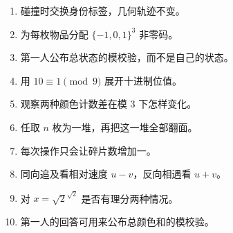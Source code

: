 \begin{enumerate}[leftmargin=*]
  \item 碰撞时交换身份标签，几何轨迹不变。
  \item 为每枚物品分配 $\{-1,0,1\}^3$ 非零码。
  \item 第一人公布总状态的模校验，而不是自己的状态。
  \item 用 $10\equiv1\pmod9$ 展开十进制位值。
  \item 观察两种颜色计数差在模 $3$ 下怎样变化。
  \item 任取 $n$ 枚为一堆，再把这一堆全部翻面。
  \item 每次操作只会让碎片数增加一。
  \item 同向追及看相对速度 $u-v$，反向相遇看 $u+v$。
  \item 对 $x=\sqrt2^{\sqrt2}$ 是否有理分两种情况。
  \item 第一人的回答可用来公布总颜色和的模校验。
\end{enumerate}
